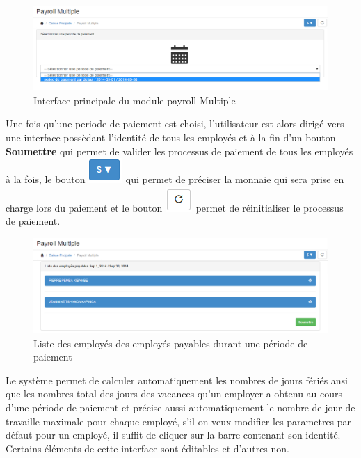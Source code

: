 \documentclass[12pt,a4paper]{report}
\begin{document}
\begin{figure}[h]
\begin{center}
\includegraphics[width=14cm]{pic/MultiPayroll.png}
\end{center}
\caption{Interface principale du module payroll Multiple}
\label{Interface principale du module payroll Multiple}
\end{figure}
\newpage
Une fois qu'une periode de paiement est choisi, l'utilisateur est alors dirigé vers une interface possèdant l'identité de tous les employés et à la fin d'un bouton \textbf{Soumettre} qui permet de valider les processus de paiement de tous les employés à la fois, le bouton \includegraphics[scale=0.7]{pic/selectCurrency.png} qui permet de préciser la monnaie qui sera prise en charge lors du paiement et le bouton \includegraphics[scale=0.7]{pic/refresh.png} permet de réinitialiser le processus de paiement.

\begin{figure}[h]
\begin{center}
\includegraphics[width=14cm]{pic/PayrollListeEmp.png}
\end{center}
\caption{Liste des employés des employés payables durant une période de paiement}
\label{Liste des employés des employés payables durant une période de paiement}
\end{figure}

Le système permet de calculer automatiquement les nombres de jours fériés ansi que les nombres total des jours des vacances qu'un employer a obtenu au cours d'une période de paiement et précise aussi automatiquement le nombre de jour de travaille maximale pour chaque employé, s'il on veux modifier les parametres par défaut pour un employé, il suffit de cliquer sur la barre contenant son identité. Certains éléments de cette interface sont éditables et d'autres non.
\end{document}
